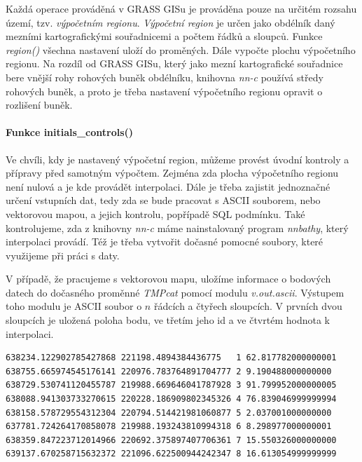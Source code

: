 \documentclass[12pt,a4paper]{article}
\begin{document}
{Každá operace prováděná v GRASS GISu je prováděna pouze na určitém
rozsahu území, tzv. \emph{výpočetním regionu}. \emph{Výpočetní region}
je určen jako obdélník daný mezními kartografickými souřadnicemi a
počtem řádků a sloupců.  Funkce \emph{region()} všechna nastavení
uloží do proměných. Dále vypočte plochu výpočetního regionu. Na rozdíl
od GRASS GISu, který jako mezní kartografické souřadnice bere vnější
rohy rohových buněk obdélníku, knihovna \emph{nn-c} používá středy
rohových buněk, a proto je třeba nastavení výpočetního regionu opravit
o rozlišení buněk.

\bigskip
\paragraph{Funkce initials\_controls()}

Ve chvíli, kdy je nastavený výpočetní region, můžeme provést úvodní
kontroly a přípravy před samotným výpočtem. Zejména zda plocha
výpočetního regionu není nulová a je kde provádět interpolaci. Dále je
třeba zajistit jednoznačné určení vstupních dat, tedy zda se bude
pracovat s ASCII souborem, nebo vektorovou mapou, a jejich kontrolu,
popřípadě SQL podmínku. Také kontrolujeme, zda z knihovny \emph{nn-c}
máme nainstalovaný program \emph{nnbathy}, který interpolaci
provádí. Též je třeba vytvořit dočasné pomocné soubory, které
využijeme při práci s daty.

V případě, že pracujeme s vektorovou mapu, uložíme informace o
bodových datech do dočasného proměnné \emph{TMPcat} pomocí modulu
\emph{v.out.ascii}. Výstupem toho modulu je ASCII soubor o $n$ řádcích
a čtyřech sloupcích. V prvních dvou sloupcích je uložená poloha bodu,
ve třetím jeho id a ve čtvrtém hodnota k interpolaci.

\bigskip
\lstset{basicstyle=\footnotesize}
\begin{lstlisting}[caption={Pomocný soubor TMPcat}]
638234.122902785427868 221198.4894384436775   1 62.817782000000001
638755.665974545176141 220976.783764891704777 2 9.190488000000000
638729.530741120455787 219988.669646041787928 3 91.799952000000005
638088.941303733270615 220228.186909802345326 4 76.839046999999994
638158.578729554312304 220794.514421981060877 5 2.037001000000000
637781.724264170858078 219988.193243810994318 6 8.298977000000001
638359.847223712014966 220692.375897407706361 7 15.550326000000000
639137.670258715632372 221096.622500944242347 8 16.613054999999999
\end{lstlisting}

}
\end{document}
